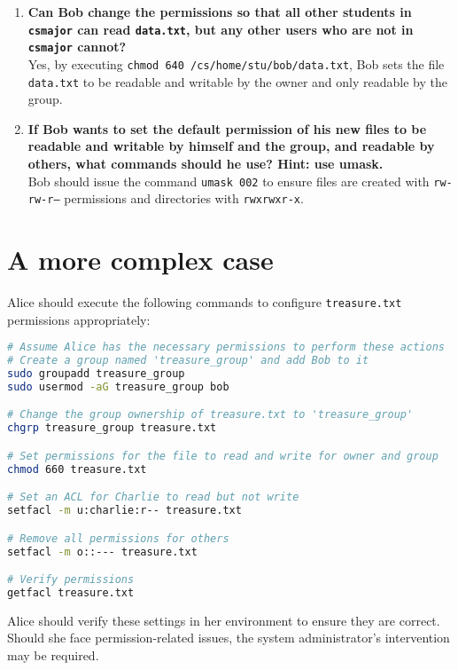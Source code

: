 \documentclass{article}
\begin{document}
\begin{enumerate}
    \item \textbf{Can Bob change the permissions so that all other students in \texttt{csmajor} can read \texttt{data.txt}, but any other users who are not in \texttt{csmajor} cannot?}\\
    Yes, by executing \texttt{chmod 640 /cs/home/stu/bob/data.txt}, Bob sets the file \texttt{data.txt} to be readable and writable by the owner and only readable by the group.
    
    \item \textbf{If Bob wants to set the default permission of his new files to be readable and writable by himself and the group, and readable by others, what commands should he use? Hint: use umask.}\\
    Bob should issue the command \texttt{umask 002} to ensure files are created with \texttt{rw-rw-r--} permissions and directories with \texttt{rwxrwxr-x}.
\end{enumerate}

\section*{A more complex case}

Alice should execute the following commands to configure \texttt{treasure.txt} permissions appropriately:

\begin{lstlisting}[language=bash]
# Assume Alice has the necessary permissions to perform these actions
# Create a group named 'treasure_group' and add Bob to it
sudo groupadd treasure_group
sudo usermod -aG treasure_group bob

# Change the group ownership of treasure.txt to 'treasure_group'
chgrp treasure_group treasure.txt

# Set permissions for the file to read and write for owner and group
chmod 660 treasure.txt

# Set an ACL for Charlie to read but not write
setfacl -m u:charlie:r-- treasure.txt

# Remove all permissions for others
setfacl -m o::--- treasure.txt

# Verify permissions
getfacl treasure.txt
\end{lstlisting}

Alice should verify these settings in her environment to ensure they are correct. Should she face permission-related issues, the system administrator’s intervention may be required.
\end{document}
